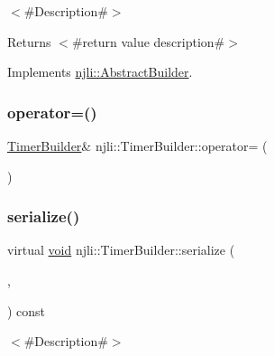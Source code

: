 $<$\#\+Description\#$>$

\begin{DoxyReturn}{Returns}
$<$\#return value description\#$>$ 
\end{DoxyReturn}


Implements \mbox{\hyperlink{classnjli_1_1_abstract_builder_a3e6e553e06d1ca30517ad5fb0bd4d000}{njli\+::\+Abstract\+Builder}}.

\mbox{\label{classnjli_1_1_timer_builder_a9767b4b54e47e49aa3d7bd377fd50499}} 
\subsubsection{\texorpdfstring{operator=()}{operator=()}}
{\footnotesize\ttfamily \mbox{\hyperlink{classnjli_1_1_timer_builder}{Timer\+Builder}}\& njli\+::\+Timer\+Builder\+::operator= (\begin{DoxyParamCaption}\item[{const \mbox{\hyperlink{classnjli_1_1_timer_builder}{Timer\+Builder}} \&}]{ }\end{DoxyParamCaption})\hspace{0.3cm}{\ttfamily [protected]}}

\mbox{\label{classnjli_1_1_timer_builder_a63d4de855d09f3ade6e13a4d07fab127}} 
\subsubsection{\texorpdfstring{serialize()}{serialize()}}
{\footnotesize\ttfamily virtual \mbox{\hyperlink{_thread_8h_af1e856da2e658414cb2456cb6f7ebc66}{void}} njli\+::\+Timer\+Builder\+::serialize (\begin{DoxyParamCaption}\item[{\mbox{\hyperlink{_thread_8h_af1e856da2e658414cb2456cb6f7ebc66}{void}} $\ast$}]{,  }\item[{bt\+Serializer $\ast$}]{ }\end{DoxyParamCaption}) const\hspace{0.3cm}{\ttfamily [virtual]}}

$<$\#\+Description\#$>$


